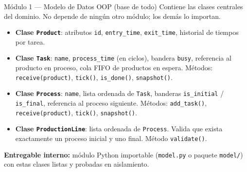 \documentclass[12pt,letterpaper]{article}
\begin{document}
\begin{modbox}[mod1]{Módulo 1 --- Modelo de Datos OOP \hfill \normalfont\small(base de todo)}
Contiene las clases centrales del dominio. No depende de ningún otro módulo; los demás lo importan.

\begin{itemize}[leftmargin=1.5em, itemsep=2pt]
    \item \textbf{Clase \texttt{Product}}: atributos \texttt{id}, \texttt{entry\_time}, \texttt{exit\_time}, historial de tiempos por tarea.
    \item \textbf{Clase \texttt{Task}}: \texttt{name}, \texttt{process\_time} (en ciclos), bandera \texttt{busy}, referencia al producto en proceso, cola FIFO de productos en espera. Métodos: \texttt{receive(product)}, \texttt{tick()}, \texttt{is\_done()}, \texttt{snapshot()}.
    \item \textbf{Clase \texttt{Process}}: \texttt{name}, lista ordenada de \texttt{Task}, banderas \texttt{is\_initial} / \texttt{is\_final}, referencia al proceso siguiente. Métodos: \texttt{add\_task()}, \texttt{receive(product)}, \texttt{tick()}, \texttt{snapshot()}.
    \item \textbf{Clase \texttt{ProductionLine}}: lista ordenada de \texttt{Process}. Valida que exista exactamente un proceso inicial y uno final. Método \texttt{validate()}.
\end{itemize}

\textbf{Entregable interno:} módulo Python importable (\texttt{model.py} o paquete \texttt{model/}) con estas clases listas y probadas en aislamiento.
\end{modbox}

\vspace{0.7em}
\end{document}
